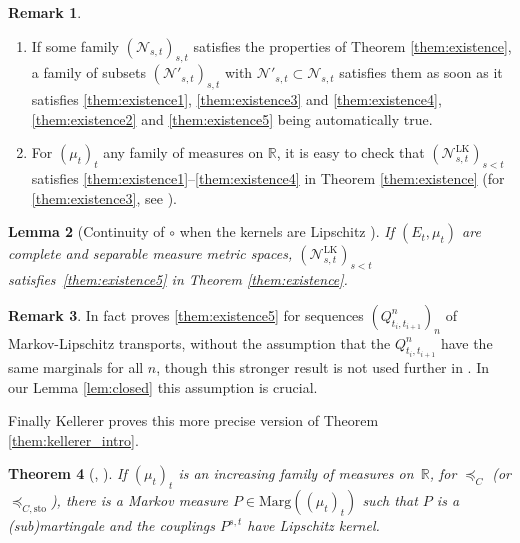\documentclass[11pt]{article}
\newcommand{\skpt}{\smallskip}
\theoremstyle{plain}
\newtheorem{them}{Theorem}[section]
\newtheorem{lem}[them]{Lemma}
\theoremstyle{definition}
\newtheorem{rem}[them]{Remark}
\newcommand{\ML}{\mathrm{LK}}
\newcommand{\ma}{\mathrm{Marg}}
\newcommand{\R}{\mathbb{R}}
\newcommand{\sto}{\mathrm{sto}}
\newcommand{\leqc}{\preceq_{C}}
\newcommand{\leqcs}{\preceq_{C,\sto}}
\begin{document}
\skpt
\begin{rem}\label{rem:otherNs}
\begin{enumerate}
\item\label{rem:otherNsa}
\label{item:rem:otherNsA} If some family $(\mathcal{N}_{s,t})_{s,t}$ satisfies the properties of Theorem \ref{them:existence}, a family of subsets $(\mathcal{N}'_{s,t})_{s,t}$ with $\mathcal{N}'_{s,t}\subset \mathcal{N}_{s,t}$ satisfies them as soon as it satisfies \eqref{them:existence1}, \eqref{them:existence3} and \eqref{them:existence4}, \eqref{them:existence2} and \eqref{them:existence5} being automatically true.

\item\label{rem:otherNsb}
\label{item:rem:otherNsB} For $(\mu_t)_t$ any family of measures on $\R$, it is easy to check that $(\mathcal{N}^\ML_{s,t})_{s<t}$ satisfies \eqref{them:existence1}--\eqref{them:existence4} in Theorem \ref{them:existence} (for \eqref{them:existence3}, see \cite[Satz 13]{Ke72}).
\end{enumerate}
\end{rem}

\begin{lem}[Continuity of $\circ$ when the kernels are Lipschitz {\cite[Sätze 14 \& 15]{Ke72}}]\label{lem:lipschtz_implique_cinq}
If $(E_t,\mu_t)$ are complete and separable measure metric spaces, $(\mathcal{N}^\ML_{s,t})_{s<t}$ satisfies~\eqref{them:existence5} in Theorem \ref{them:existence}.
\end{lem}

\begin{rem}In fact \cite[Sätze 14 \& 15]{Ke72} proves \eqref{them:existence5} for sequences $(Q_{t_i,t_{i+1}}^n)_n$ of Markov-Lipschitz transports, without the assumption that the $Q_{t_i,t_{i+1}}^n$ have the same marginals for all $n$, though this stronger result is not used further in \cite{Ke72}. In our Lemma \ref{lem:closed} this assumption is crucial.
\end{rem}

Finally Kellerer proves this more precise version of Theorem \ref{them:kellerer_intro}.

\begin{them}[{\cite[Th.\,3]{Ke72}, \cite{Ke73}}]\label{them:kellerer_final} If $(\mu_t)_t$ is an increasing family of measures on~$\R$, for $\leqc$ (or $\leqcs$), there is a Markov measure $P\in\ma((\mu_t)_t)$ such that $P$ is a (sub)martingale and the couplings $P^{s,t}$ have Lipschitz kernel.
\end{them}
\end{document}
